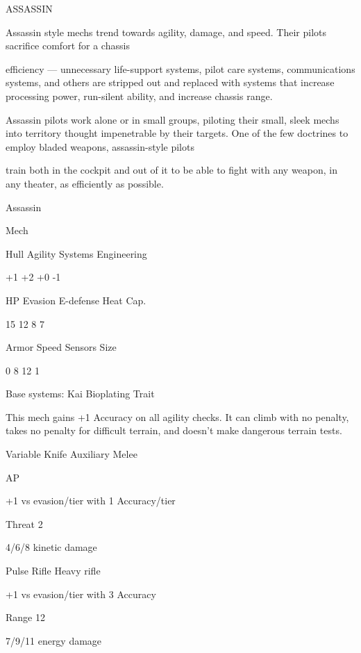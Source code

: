                                                  ASSASSIN  

Assassin style mechs trend towards agility, damage, and speed. Their pilots sacrifice comfort for a chassis  

efficiency — unnecessary life-support systems, pilot care systems, communications systems, and others  
are stripped out and replaced with systems that increase processing power, run-silent ability, and increase  
chassis range.   

Assassin pilots work alone or in small groups, piloting their small, sleek mechs into territory thought  
impenetrable by their targets. One of the few doctrines to employ bladed weapons, assassin-style pilots  

train both in the cockpit and out of it to be able to fight with any weapon, in any theater, as efficiently as  
possible.   

 Assassin 

 Mech 

 Hull        Agility      Systems        Engineering 

 +1          +2           +0             -1 

 HP          Evasion      E-defense      Heat Cap. 

  15         12           8              7 

 Armor       Speed        Sensors       Size 

 0           8            12             1 

Base systems:  
Kai Bioplating  
Trait
 
This mech gains +1 Accuracy on all agility checks. It can climb with no penalty, takes no penalty  
for difficult terrain, and doesn’t make dangerous terrain tests.
 

Variable Knife  
Auxiliary Melee
 
AP
 
+1 vs evasion/tier with 1 Accuracy/tier
 
Threat 2
 
4/6/8 kinetic damage
 

Pulse Rifle  
Heavy rifle
 
+1 vs evasion/tier with 3 Accuracy
 
Range 12
 
7/9/11 energy damage
 

                                                                                                               


